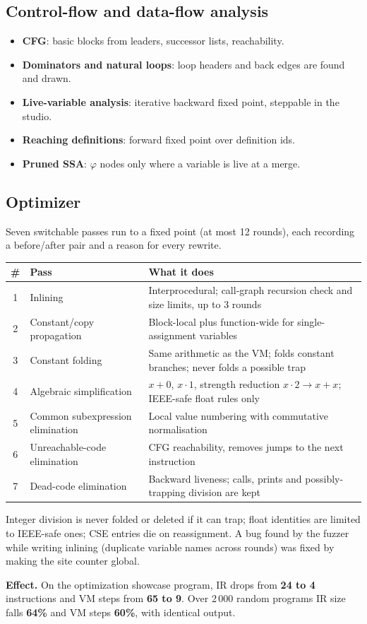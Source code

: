 \documentclass[11pt,a4paper]{article}
\begin{document}
\subsection{Control-flow and data-flow analysis}
\begin{itemize}
\item \textbf{CFG}: basic blocks from leaders, successor lists, reachability.
\item \textbf{Dominators and natural loops}: loop headers and back edges are found and drawn.
\item \textbf{Live-variable analysis}: iterative backward fixed point, steppable in the studio.
\item \textbf{Reaching definitions}: forward fixed point over definition ids.
\item \textbf{Pruned SSA}: $\varphi$ nodes only where a variable is live at a merge.
\end{itemize}

\subsection{Optimizer}
Seven switchable passes run to a fixed point (at most 12 rounds), each recording a before/after pair and a reason for every rewrite.
\begin{center}\small
\begin{tabularx}{\linewidth}{@{}c l X@{}}\toprule
\# & Pass & What it does\\\midrule
1 & Inlining & Interprocedural; call-graph recursion check and size limits, up to 3 rounds\\
2 & Constant/copy propagation & Block-local plus function-wide for single-assignment variables\\
3 & Constant folding & Same arithmetic as the VM; folds constant branches; never folds a possible trap\\
4 & Algebraic simplification & $x{+}0$, $x{\cdot}1$, strength reduction $x{\cdot}2\to x{+}x$; IEEE-safe float rules only\\
5 & Common subexpression elimination & Local value numbering with commutative normalisation\\
6 & Unreachable-code elimination & CFG reachability, removes jumps to the next instruction\\
7 & Dead-code elimination & Backward liveness; calls, prints and possibly-trapping division are kept\\\bottomrule
\end{tabularx}
\end{center}
\begin{aim}
Integer division is never folded or deleted if it can trap; float identities are limited to IEEE-safe ones; CSE entries die on reassignment. A bug found by the fuzzer while writing inlining (duplicate variable names across rounds) was fixed by making the site counter global.
\end{aim}
\textbf{Effect.} On the optimization showcase program, IR drops from \textbf{24 to 4} instructions and VM steps from \textbf{65 to 9}. Over 2\,000 random programs IR size falls \textbf{64\%} and VM steps \textbf{60\%}, with identical output.
\end{document}
